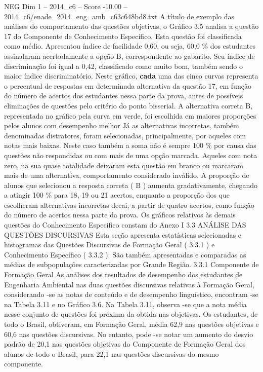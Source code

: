 \begin{textsample}{NEG Dim 1 – 2014\_c6 – Score -10.00 – 2014\_c6/enade\_2014\_eng\_amb\_c63c648bd8.txt}
A título de exemplo das análises do comportamento das questões objetivas, o Gráfico 3.5 analisa a questão 17 do Componente de Conhecimento Específico.
Esta questão foi classificada como médio.
Apresentou índice de facilidade 0,60, ou seja, 60,0 \% dos estudantes assinalaram acertadamente a opção B, correspondente ao gabarito.
Seu índice de discriminação foi igual a 0,42, classificado como muito bom, também sendo o maior índice discriminatório.
Neste gráfico, \textbf{cada} uma das cinco curvas representa o percentual de respostas em determinada alternativa da questão 17, em função do número de acertos dos estudantes nessa parte da prova, antes de possíveis eliminações de questões pelo critério do ponto bisserial.
A alternativa correta B, representada no gráfico pela curva em verde, foi escolhida em maiores proporções pelos alunos com desempenho melhor Já as alternativas incorretas, também denominadas distratores, foram selecionadas, principalmente, por aqueles com notas mais baixas.
Neste caso também a soma não é sempre 100 \% por causa das questões não respondidas ou com mais de uma opção marcada.
Aqueles com nota zero, na sua quase totalidade deixaram esta questão em branco ou marcaram mais de uma alternativa, comportamento considerado inválido.
A proporção de alunos que selecionou a resposta correta ( B ) aumenta gradativamente, chegando a atingir 100 \% para 18, 19 ou 21 acertos, enquanto a proporção dos que escolheram alternativas incorretas decai, a partir de quatro acertos, como função do número de acertos nessa parte da prova.
Os gráficos relativos às demais questões do Conhecimento Específico constam do Anexo I 3.3 ANÁLISE DAS QUESTÕES DISCURSIVAS Esta seção apresenta estatísticas selecionadas e histogramas das Questões Discursivas de Formação Geral ( 3.3.1 ) e Conhecimento Específico ( 3.3.2 ).
São também apresentadas e comparadas as médias de subpopulações caracterizadas por Grande Região. 3.3.1 Componente de Formação Geral As análises dos resultados de desempenho dos estudantes de Engenharia Ambiental nas duas questões discursivas relativas à Formação Geral, considerando -se as notas de conteúdo e de desempenho linguístico, encontram -se na Tabela 3.11 e no Gráfico 3.6.
Na Tabela 3.11, observa -se que a nota média nesse conjunto de questões foi próxima da obtida nas objetivas.
Os estudantes, de todo o Brasil, obtiveram, em Formação Geral, média 62,9 nas questões objetivas e 60,6 nas questões discursivas.
No entanto, pode -se notar um aumento do desvio padrão de 20,1 nas questões objetivas do Componente de Formação Geral dos alunos de todo o Brasil, para 22,1 nas questões discursivas do mesmo componente.

\end{textsample}

